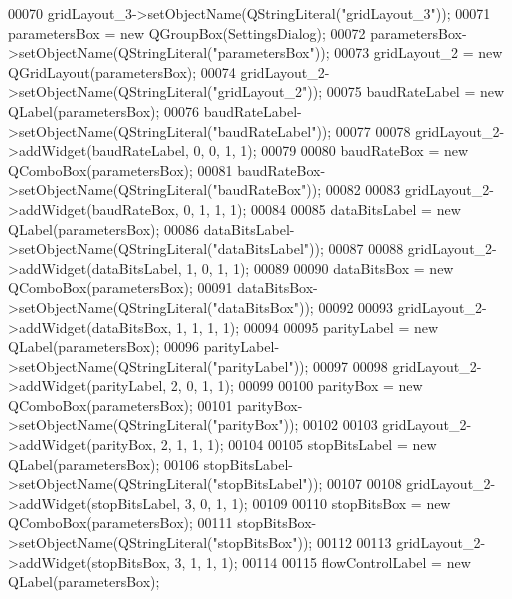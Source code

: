 \begin{DoxyCode}
00070         gridLayout\_3->setObjectName(QStringLiteral(\textcolor{stringliteral}{"gridLayout\_3"}));
00071         parametersBox = \textcolor{keyword}{new} QGroupBox(SettingsDialog);
00072         parametersBox->setObjectName(QStringLiteral(\textcolor{stringliteral}{"parametersBox"}));
00073         gridLayout\_2 = \textcolor{keyword}{new} QGridLayout(parametersBox);
00074         gridLayout\_2->setObjectName(QStringLiteral(\textcolor{stringliteral}{"gridLayout\_2"}));
00075         baudRateLabel = \textcolor{keyword}{new} QLabel(parametersBox);
00076         baudRateLabel->setObjectName(QStringLiteral(\textcolor{stringliteral}{"baudRateLabel"}));
00077 
00078         gridLayout\_2->addWidget(baudRateLabel, 0, 0, 1, 1);
00079 
00080         baudRateBox = \textcolor{keyword}{new} QComboBox(parametersBox);
00081         baudRateBox->setObjectName(QStringLiteral(\textcolor{stringliteral}{"baudRateBox"}));
00082 
00083         gridLayout\_2->addWidget(baudRateBox, 0, 1, 1, 1);
00084 
00085         dataBitsLabel = \textcolor{keyword}{new} QLabel(parametersBox);
00086         dataBitsLabel->setObjectName(QStringLiteral(\textcolor{stringliteral}{"dataBitsLabel"}));
00087 
00088         gridLayout\_2->addWidget(dataBitsLabel, 1, 0, 1, 1);
00089 
00090         dataBitsBox = \textcolor{keyword}{new} QComboBox(parametersBox);
00091         dataBitsBox->setObjectName(QStringLiteral(\textcolor{stringliteral}{"dataBitsBox"}));
00092 
00093         gridLayout\_2->addWidget(dataBitsBox, 1, 1, 1, 1);
00094 
00095         parityLabel = \textcolor{keyword}{new} QLabel(parametersBox);
00096         parityLabel->setObjectName(QStringLiteral(\textcolor{stringliteral}{"parityLabel"}));
00097 
00098         gridLayout\_2->addWidget(parityLabel, 2, 0, 1, 1);
00099 
00100         parityBox = \textcolor{keyword}{new} QComboBox(parametersBox);
00101         parityBox->setObjectName(QStringLiteral(\textcolor{stringliteral}{"parityBox"}));
00102 
00103         gridLayout\_2->addWidget(parityBox, 2, 1, 1, 1);
00104 
00105         stopBitsLabel = \textcolor{keyword}{new} QLabel(parametersBox);
00106         stopBitsLabel->setObjectName(QStringLiteral(\textcolor{stringliteral}{"stopBitsLabel"}));
00107 
00108         gridLayout\_2->addWidget(stopBitsLabel, 3, 0, 1, 1);
00109 
00110         stopBitsBox = \textcolor{keyword}{new} QComboBox(parametersBox);
00111         stopBitsBox->setObjectName(QStringLiteral(\textcolor{stringliteral}{"stopBitsBox"}));
00112 
00113         gridLayout\_2->addWidget(stopBitsBox, 3, 1, 1, 1);
00114 
00115         flowControlLabel = \textcolor{keyword}{new} QLabel(parametersBox);

\end{DoxyCode}
